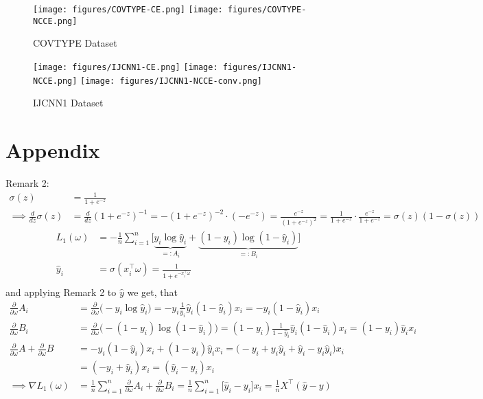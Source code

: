 \documentclass{article}
\begin{document}
\begin{figure}
    \centering
    \caption{COVTYPE Dataset}
    \texttt{[image: figures/COVTYPE-CE.png]}
    \texttt{[image: figures/COVTYPE-NCCE.png]}
\end{figure}

\begin{figure}
    \centering
    \caption{IJCNN1 Dataset}
    \texttt{[image: figures/IJCNN1-CE.png]}
    \texttt{[image: figures/IJCNN1-NCCE.png]}
    \texttt{[image: figures/IJCNN1-NCCE-conv.png]}
\end{figure}
\newpage

\newpage
\section{Appendix}
Remark 2:
\begin{align*}
  \sigma(z) &= \frac{1}{1 + e^{-z}} \\
  \implies \frac{d}{dz} \sigma(z) &= \frac{d}{dz} (1 + e^{-z})^{-1}
  = -(1 + e^{-z})^{-2} \cdot (-e^{-z}) = \frac{e^{-z}}{(1 + e^{-z})^2}
  = \frac{1}{1 + e^{-z}} \cdot \frac{e^{-z}}{1 + e^{-z}}
  = \sigma(z) (1 - \sigma(z))
\end{align*}
\begin{align*}
L_1(\omega) &= -\frac{1}{n} \sum_{i=1}^n \Big[\underbrace{y_i \log \hat{y}_i}_{=:A_i} + \underbrace{(1 - y_i) \log (1 - \hat{y}_i)}_{=:B_i}\Big] \\
\hat{y}_i &= \sigma(x_i^\top \omega) = \frac{1}{1 + e^{-x_i^\top \omega}} \\
\end{align*}
and applying Remark 2 to $\hat{y}$ we get, that
\begin{align*}
\frac{\partial}{\partial \omega} A_i &= \frac{\partial}{\partial \omega}\big(-y_i \log \hat{y}_i\big) = -y_i \frac{1}{\hat{y}_i} \hat{y}_i (1 - \hat{y}_i) x_i = -y_i (1 - \hat{y}_i) x_i \\
%
\frac{\partial}{\partial \omega} B_i &=\frac{\partial}{\partial \omega} \big(-(1 - y_i) \log (1 - \hat{y}_i)\big) = (1 - y_i) \frac{1}{1 - \hat{y}_i} \hat{y}_i (1 - \hat{y}_i) x_i = (1 - y_i) \hat{y}_i x_i\\
%
\frac{\partial}{\partial \omega} A+\frac{\partial}{\partial \omega} B &= -y_i (1 - \hat{y}_i) x_i + (1 - y_i) \hat{y}_i x_i 
= \big(-y_i + y_i \hat{y}_i + \hat{y}_i - y_i \hat{y}_i \big) x_i\\
&= (-y_i + \hat{y}_i) x_i = (\hat{y}_i-y_i ) x_i\\
%
\implies \nabla L_1(\omega) &= \frac{1}{n} \sum_{i=1}^n \frac{\partial}{\partial \omega} A_i+\frac{\partial}{\partial \omega} B_i
= \frac{1}{n} \sum_{i=1}^n \big[\hat{y}_i - y_i\big] x_i = \frac{1}{n} X^\top (\hat{y} - y)
\end{align*}
\end{document}
